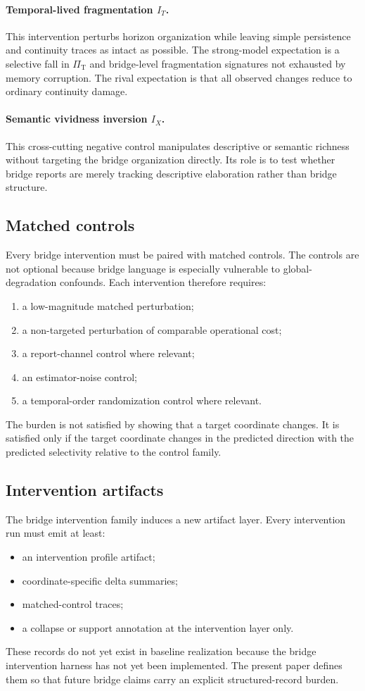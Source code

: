 \documentclass[11pt,a4paper]{article}
\theoremstyle{definition}
\newcommand{\PiT}{\Pi_{\mathrm{T}}}
\begin{document}
\paragraph{Temporal-lived fragmentation $I_T$.}
This intervention perturbs horizon organization while leaving simple persistence and continuity traces as intact as possible. The strong-model expectation is a selective fall in $\PiT$ and bridge-level fragmentation signatures not exhausted by memory corruption. The rival expectation is that all observed changes reduce to ordinary continuity damage.

\paragraph{Semantic vividness inversion $I_X$.}
This cross-cutting negative control manipulates descriptive or semantic richness without targeting the bridge organization directly. Its role is to test whether bridge reports are merely tracking descriptive elaboration rather than bridge structure.

\subsection{Matched controls}
Every bridge intervention must be paired with matched controls. The controls are not optional because bridge language is especially vulnerable to global-degradation confounds. Each intervention therefore requires:
\begin{enumerate}[leftmargin=1.5em]
\item a low-magnitude matched perturbation;
\item a non-targeted perturbation of comparable operational cost;
\item a report-channel control where relevant;
\item an estimator-noise control;
\item a temporal-order randomization control where relevant.
\end{enumerate}
The burden is not satisfied by showing that a target coordinate changes. It is satisfied only if the target coordinate changes in the predicted direction with the predicted selectivity relative to the control family.

\subsection{Intervention artifacts}
The bridge intervention family induces a new artifact layer. Every intervention run must emit at least:
\begin{itemize}[leftmargin=1.5em]
\item an intervention profile artifact;
\item coordinate-specific delta summaries;
\item matched-control traces;
\item a collapse or support annotation at the intervention layer only.
\end{itemize}
These records do not yet exist in baseline realization because the bridge intervention harness has not yet been implemented. The present paper defines them so that future bridge claims carry an explicit structured-record burden.
\end{document}
